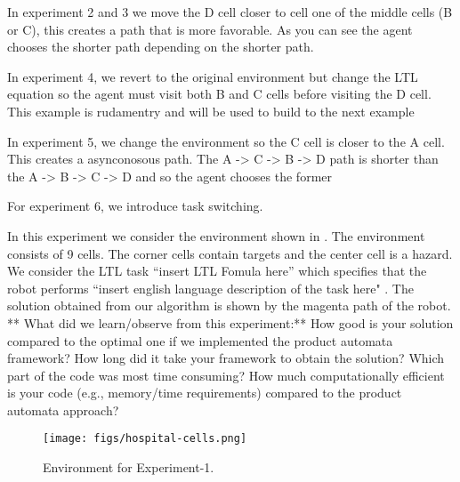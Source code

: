 \documentclass[letter paper, 10 pt, conference]{ieeeconf}
\begin{document}
In experiment 2 and 3 we move the D cell closer to cell one of the middle cells (B or C), this creates a path that is more favorable. As you can see the agent chooses the shorter path depending on the shorter path.


In experiment 4, we revert to the original environment but change the LTL equation so the agent must visit both B and C cells before visiting the D cell. This example is rudamentry and will be used to build to the next example

In experiment 5, we change the environment so the C cell is closer to the A cell. This creates a asynconosous path. The A -> C -> B -> D path is shorter than the A -> B -> C -> D and so the agent chooses the former

For experiment 6, we introduce task switching.


In this experiment we consider the environment shown in .
The environment consists of 9 cells. The corner cells contain targets and the center cell is a hazard.
We consider the LTL task ``insert LTL Fomula here'' which specifies that the robot performs ``insert english language description of the task here" .
The solution obtained from our algorithm is shown by the magenta path of the robot.
** What did we learn/observe from this experiment:**
How good is your solution compared to the optimal one if we implemented the product automata framework?
How long did it take your framework to obtain the solution?
Which part of the code was most time consuming?
How much computationally efficient is your code  (e.g., memory/time requirements) compared to the product automata approach?
\begin{figure}
    \centering
    \texttt{[image: figs/hospital-cells.png]}
    \caption{Environment for Experiment-1.}
    \label{fig:env1}
\end{figure}


% 
\end{document}
